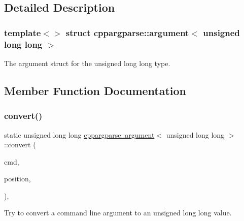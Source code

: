 \subsection{Detailed Description}
\subsubsection*{template$<$$>$\newline
struct cppargparse\+::argument$<$ unsigned long long $>$}

The argument struct for the unsigned long long type. 

\subsection{Member Function Documentation}
\mbox{\label{structcppargparse_1_1argument_3_01unsigned_01long_01long_01_4_ac17e3c6079e302a59b23485ed64b2c37}} 
\subsubsection{\texorpdfstring{convert()}{convert()}}
{\footnotesize\ttfamily static unsigned long long \hyperlink{structcppargparse_1_1argument}{cppargparse\+::argument}$<$ unsigned long long $>$\+::convert (\begin{DoxyParamCaption}\item[{const \hyperlink{types_8h_a80adf2418b7ce9fe616698efa7533ecf}{types\+::\+Command\+Line\+\_\+t} \&}]{cmd,  }\item[{const \hyperlink{types_8h_a43b4f43f8940de1bf09ced6f1b668053}{types\+::\+Command\+Line\+Position\+\_\+t} \&}]{position,  }\item[{const \hyperlink{types_8h_a003c660afe2ee9c6cc39aea966e8926d}{types\+::\+Command\+Line\+Arguments\+\_\+t} \&}]{ }\end{DoxyParamCaption})\hspace{0.3cm}{\ttfamily [inline]}, {\ttfamily [static]}}



Try to convert a command line argument to an unsigned long long value. 


